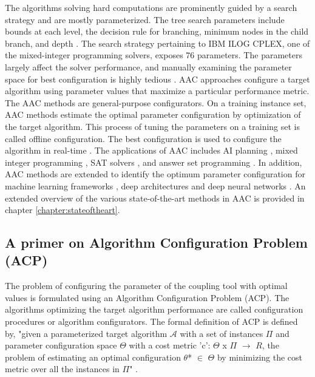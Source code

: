 The algorithms solving hard computations are prominently guided by a search strategy and are mostly parameterized. The tree search parameters include bounds at each level, the decision rule for branching, minimum nodes in the child branch, and depth \cite{SMAC_extendedpaper}. The search strategy pertaining to IBM ILOG CPLEX, one of the mixed-integer programming solvers, exposes 76 parameters. The parameters largely affect the solver performance, and manually examining the parameter space for best configuration is highly tedious \cite{SMAC_extendedpaper}. 
AAC approaches configure a target algorithm using parameter values that maximize a particular performance metric. The AAC methods are general-purpose configurators. On a training instance set, AAC methods estimate the optimal parameter configuration by optimization of the target algorithm. This process of tuning the parameters on a training set is called offline configuration. The best configuration is used to configure the algorithm in real-time \cite{SMAC_extendedpaper}. The applications of AAC includes AI planning \cite{AIplanning}, mixed integer programming \cite{ParamILS_mainpaper}, SAT solvers \cite{SAT_examplepaper}, and answer set programming \cite{ASP_solver}. In addition, AAC methods are extended to identify the optimum parameter configuration for machine learning frameworks \cite{Expertdown2} \cite{Robust_AutoML}, deep architectures and deep neural networks \cite{HPO_AC} \cite{AC_benchmarking}. An extended overview of the various state-of-the-art methods in AAC is provided in chapter \ref{chapter:stateoftheart}.

\subsection{A primer on Algorithm Configuration Problem (ACP)}

The problem of configuring the parameter of the coupling tool with optimal values is formulated using an Algorithm Configuration Problem (ACP). The algorithms optimizing the target algorithm performance are called configuration procedures or algorithm configurators. The formal definition of ACP is defined by, "given a parameterized target algorithm $\mathcal{A}$ with a set of instances $\Pi$ and parameter configuration space $\Theta$ with a cost metric 'c': $\Theta$ x $\Pi$ $\rightarrow$ $R$, the problem of estimating an optimal configuration $\theta$* $\in$ $\Theta$ by minimizing the cost metric over all the instances in $\Pi$" \cite{Pitfalls} \cite{AC_benchmarking}. 

